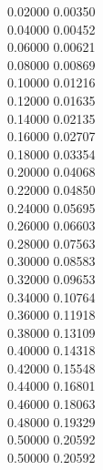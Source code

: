 \documentclass[a4paper,12pt,twoside]{report}
\numberwithin{equation}{chapter}
\begin{document}
\begin{texttt}
   0.02000\hspace{1cm}    0.00350 \\
   0.04000\hspace{1cm}    0.00452 \\
   0.06000\hspace{1cm}    0.00621 \\
   0.08000\hspace{1cm}    0.00869 \\
   0.10000\hspace{1cm}    0.01216 \\
   0.12000\hspace{1cm}    0.01635 \\
   0.14000\hspace{1cm}    0.02135 \\
   0.16000\hspace{1cm}    0.02707 \\
   0.18000\hspace{1cm}    0.03354 \\
   0.20000\hspace{1cm}    0.04068 \\
   0.22000\hspace{1cm}    0.04850 \\
   0.24000\hspace{1cm}    0.05695 \\
   0.26000\hspace{1cm}    0.06603 \\
   0.28000\hspace{1cm}    0.07563 \\
   0.30000\hspace{1cm}    0.08583 \\
   0.32000\hspace{1cm}    0.09653 \\
   0.34000\hspace{1cm}    0.10764 \\
   0.36000\hspace{1cm}    0.11918 \\
   0.38000\hspace{1cm}    0.13109 \\
   0.40000\hspace{1cm}    0.14318 \\
   0.42000\hspace{1cm}    0.15548 \\
   0.44000\hspace{1cm}    0.16801 \\
   0.46000\hspace{1cm}    0.18063 \\
   0.48000\hspace{1cm}    0.19329 \\
   0.50000\hspace{1cm}    0.20592 \\
   0.50000\hspace{1cm}    0.20592 \\
\end{texttt}

\end{document}
